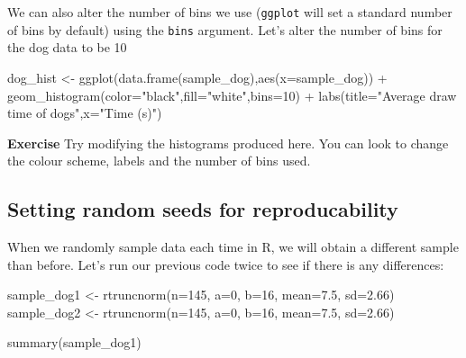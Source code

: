 \documentclass[
]{book}
\newenvironment{Shaded}{\begin{snugshade}}{\end{snugshade}}
\newcommand{\AttributeTok}[1]{\textcolor[rgb]{0.77,0.63,0.00}{#1}}
\newcommand{\DecValTok}[1]{\textcolor[rgb]{0.00,0.00,0.81}{#1}}
\newcommand{\FloatTok}[1]{\textcolor[rgb]{0.00,0.00,0.81}{#1}}
\newcommand{\FunctionTok}[1]{\textcolor[rgb]{0.00,0.00,0.00}{#1}}
\newcommand{\NormalTok}[1]{#1}
\newcommand{\OtherTok}[1]{\textcolor[rgb]{0.56,0.35,0.01}{#1}}
\newcommand{\SpecialCharTok}[1]{\textcolor[rgb]{0.00,0.00,0.00}{#1}}
\newcommand{\StringTok}[1]{\textcolor[rgb]{0.31,0.60,0.02}{#1}}
\begin{document}
We can also alter the number of bins we use (\texttt{ggplot} will set a standard number of bins by default) using the \texttt{bins} argument. Let's alter the number of bins for the dog data to be 10

\begin{Shaded}
\begin{Highlighting}[]
\NormalTok{dog\_hist }\OtherTok{\textless{}{-}} \FunctionTok{ggplot}\NormalTok{(}\FunctionTok{data.frame}\NormalTok{(sample\_dog),}\FunctionTok{aes}\NormalTok{(}\AttributeTok{x=}\NormalTok{sample\_dog)) }\SpecialCharTok{+} \FunctionTok{geom\_histogram}\NormalTok{(}\AttributeTok{color=}\StringTok{"black"}\NormalTok{,}\AttributeTok{fill=}\StringTok{"white"}\NormalTok{,}\AttributeTok{bins=}\DecValTok{10}\NormalTok{) }\SpecialCharTok{+} 
  \FunctionTok{labs}\NormalTok{(}\AttributeTok{title=}\StringTok{"Average draw time of dogs"}\NormalTok{,}\AttributeTok{x=}\StringTok{"Time (s)"}\NormalTok{)}
\end{Highlighting}
\end{Shaded}

\textbf{Exercise}
Try modifying the histograms produced here. You can look to change the colour scheme, labels and the number of bins used.

\hypertarget{setting-random-seeds-for-reproducability}{%
\subsection{Setting random seeds for reproducability}\label{setting-random-seeds-for-reproducability}}

When we randomly sample data each time in R, we will obtain a different sample than before. Let's run our previous code twice to see if there is any differences:

\begin{Shaded}
\begin{Highlighting}[]
\NormalTok{sample\_dog1 }\OtherTok{\textless{}{-}} \FunctionTok{rtruncnorm}\NormalTok{(}\AttributeTok{n=}\DecValTok{145}\NormalTok{, }\AttributeTok{a=}\DecValTok{0}\NormalTok{, }\AttributeTok{b=}\DecValTok{16}\NormalTok{, }\AttributeTok{mean=}\FloatTok{7.5}\NormalTok{, }\AttributeTok{sd=}\FloatTok{2.66}\NormalTok{)}
\NormalTok{sample\_dog2 }\OtherTok{\textless{}{-}} \FunctionTok{rtruncnorm}\NormalTok{(}\AttributeTok{n=}\DecValTok{145}\NormalTok{, }\AttributeTok{a=}\DecValTok{0}\NormalTok{, }\AttributeTok{b=}\DecValTok{16}\NormalTok{, }\AttributeTok{mean=}\FloatTok{7.5}\NormalTok{, }\AttributeTok{sd=}\FloatTok{2.66}\NormalTok{)}

\FunctionTok{summary}\NormalTok{(sample\_dog1)}
\end{Highlighting}
\end{Shaded}
\end{document}
